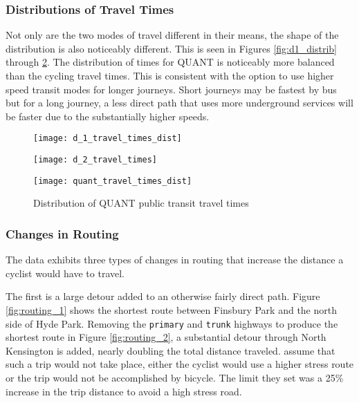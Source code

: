 \subsubsection{Distributions of Travel Times}

Not only are the two modes of travel different in their means, the shape of the distribution is also noticeably different. This is seen in Figures \ref{fig:d1_distrib} through \ref{fig:quant_distrib}. The distribution of times for QUANT is noticeably more balanced than the cycling travel times. This is consistent with the option to use higher speed transit modes for longer journeys. Short journeys may be fastest by bus but for a long journey, a less direct path that uses more underground services will be faster due to the substantially higher speeds. 



\begin{figure}
\centering
\begin{minipage}{.5\textwidth}
  \centering
  \texttt{[image: d\_1\_travel\_times\_dist]}
  \label{fig:d1_distrib}
\end{minipage}%
\begin{minipage}{.5\textwidth}
  \centering
  \texttt{[image: d\_2\_travel\_times]}
  \label{fig:d2_distrib}
\end{minipage}
\end{figure}

\begin{figure}
\centering
\texttt{[image: quant\_travel\_times\_dist]}
\caption{Distribution of QUANT public transit travel times}
\label{fig:quant_distrib}
\end{figure}


\subsubsection{Changes in Routing} 

The data exhibits three types of changes in routing that increase the distance a cyclist would have to travel. 

The first is a large detour added to an otherwise fairly direct path. Figure \ref{fig:routing_1} shows the shortest route between Finsbury Park and the north side of Hyde Park. Removing the \texttt{primary} and \texttt{trunk} highways to produce the shortest route in Figure \ref{fig:routing_2}, a substantial detour through North Kensington is added, nearly doubling the total distance traveled. \textcite{furth2016network} assume that such a trip would not take place, either the cyclist would use a higher stress route or the trip would not be accomplished by bicycle. The limit they set was a 25\% increase in the trip distance to avoid a high stress road. 

